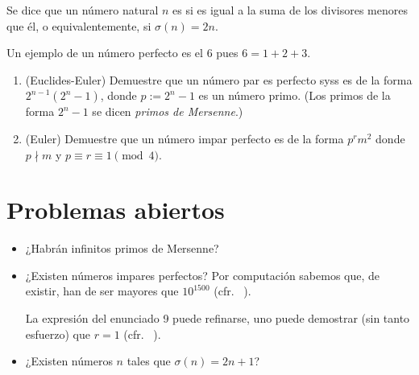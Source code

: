 \documentclass[11pt, reqno]{amsart}
\begin{document}
\begin{mydef}
	Se dice que un número natural $n$ es  si es igual a la suma de los divisores menores que él,
	o equivalentemente, si $\sigma(n) = 2n$.
\end{mydef}
Un ejemplo de un número perfecto es el 6 pues $6 = 1 + 2 + 3$.

\begin{enumerate}[resume]
	\item
		(Euclides-Euler) Demuestre que un número par es perfecto syss es de la forma $2^{n-1}(2^n - 1)$,
		donde $p := 2^n - 1$ es un número primo.
		(Los primos de la forma $2^n - 1$ se dicen \emph{primos de Mersenne}.)

	\item (Euler) Demuestre que un número impar perfecto es de la forma $p^r m^2$ donde $p \nmid m$ y $p \equiv r \equiv 1 \pmod 4$.
\end{enumerate}

\section*{Problemas abiertos}
\begin{itemize}
	\item ¿Habrán infinitos primos de Mersenne?
	\item ¿Existen números impares perfectos?
		Por computación sabemos que, de existir, han de ser mayores que $10^{1500}$ (cfr. \citeauthor{ochem2012perfect}~\cite{ochem2012perfect}).
		
		La expresión del enunciado 9 puede refinarse, uno puede demostrar (sin tanto esfuerzo) que $r = 1$
		(cfr. \citeauthor{desouza2018odd}~\cite{desouza2018odd}).
	\item ¿Existen números $n$ tales que $\sigma(n) = 2n+1$?
\end{itemize}

\nocite{burton:elementary, andreescu:problems}
\printbibliography[title={Referencias y lecturas adicionales}]
\end{document}

